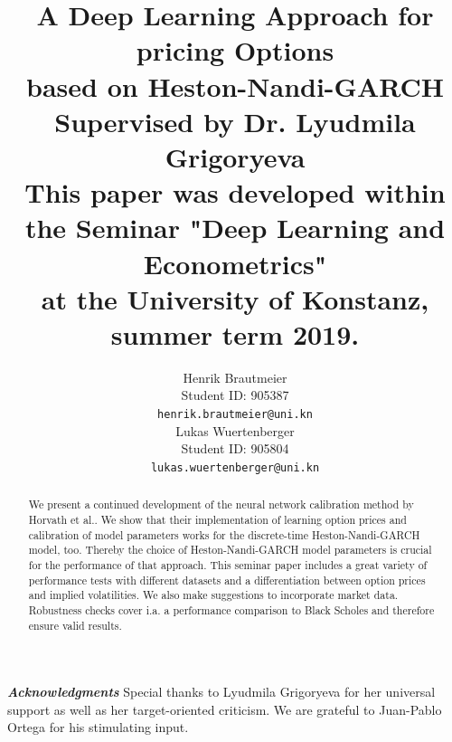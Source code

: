 \documentclass{article}
\title{A Deep Learning Approach for pricing Options \\ based on Heston-Nandi-GARCH  \\ \vspace{.38cm} {\footnotesize Supervised by Dr. Lyudmila Grigoryeva \\ \vspace{.38cm} This paper was developed within the Seminar "Deep Learning and Econometrics" \\ at the University of Konstanz, summer term 2019.}}
\author{
  Henrik Brautmeier \\
  Student ID: 905387 \\
  \texttt{henrik.brautmeier@uni.kn} \\
   \And
 Lukas Wuertenberger \\
 Student ID: 905804 \\
 \texttt{lukas.wuertenberger@uni.kn} \\
}
\begin{document}
\maketitle
\begin{abstract}
We present a continued development of the neural network calibration method by Horvath et al.\cite{Blanka}. We show that their implementation of learning option prices and calibration of model parameters works for the  discrete-time Heston-Nandi-GARCH model, too. Thereby the choice of Heston-Nandi-GARCH model parameters is crucial for the performance of that approach. This seminar paper includes a great variety of performance tests with different datasets and a differentiation between option prices and implied volatilities. We also make suggestions to incorporate market data. Robustness checks cover i.a. a performance comparison to Black Scholes and therefore ensure valid results.
\end{abstract}


\textit{\textbf{Acknowledgments}} Special thanks to Lyudmila Grigoryeva for her universal support as well as her target-oriented criticism. We are grateful to Juan-Pablo Ortega for his stimulating input.

\newpage \tableofcontents\newpage
\end{document}
